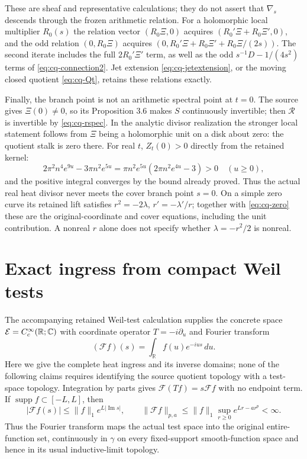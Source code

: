 These are sheaf and representative calculations; they do not assert
that $\nabla_s$ descends through the frozen arithmetic relation.
For a holomorphic local multiplier $R_0(s)$ the relation vector
$(R_0\Xi,0)$ acquires $(R_0'\Xi+R_0\Xi',0)$, and the odd
relation $(0,R_0\Xi)$ acquires
$(0,R_0'\Xi+R_0\Xi'+R_0\Xi/(2s))$.
The second iterate includes the full $2R_0'\Xi'$ term, as well as
the odd $s^{-1}D-1/(4s^2)$ terms of
\eqref{eq:cq-connection2}. Jet extension
\eqref{eq:cq-jetextension}, or the moving closed quotient
\eqref{eq:cq-Qt}, retains these relations exactly.

Finally, the branch point is not an arithmetic spectral point at
$t=0$. The source gives $\Xi(0)\ne0$, so its Proposition 3.6
makes $S$ continuously invertible; then $\mathcal R$ is invertible
by \eqref{eq:cq-rspec}. In the analytic divisor realization the
stronger local statement follows from $\Xi$ being a holomorphic
unit on a disk about zero: the quotient stalk is zero there.
For real $t$, $Z_t(0)>0$ directly from the retained kernel:
\[
 2\pi^2n^4e^{9u}-3\pi n^2e^{5u}
 =\pi n^2e^{5u}(2\pi n^2e^{4u}-3)>0\quad(u\geq0),
\]
and the positive integral converges by the bound already proved.
Thus the actual real heat divisor never meets the cover branch
point $s=0$. On a simple zero curve its retained lift satisfies
$r^2=-2\lambda$, $r'=-\lambda'/r$; together with
\eqref{eq:cq-zero} these are the original-coordinate and cover
equations, including the unit contribution. A nonreal $r$ alone
does not specify whether $\lambda=-r^2/2$ is nonreal.

\section{Exact ingress from compact Weil tests}
\label{sec:cq-tests}
The accompanying retained Weil-test calculation supplies the concrete
space $\mathcal E=C_c^\infty(\mathbb R;\mathbb C)$ with coordinate
operator $T=-i\partial_u$ and Fourier transform
\[
 (\mathscr Ff)(s)=\int_{\mathbb R}f(u)e^{-ius}\,du.
\]
Here we give the complete heat ingress and its inverse domains;
none of the following claims requires identifying the source
quotient topology with a test-space topology. Integration by parts
gives $\mathscr F(Tf)=s\mathscr Ff$ with no endpoint term.
If $\operatorname{supp}f\subset[-L,L]$, then
\[
 |\mathscr Ff(s)|\leq\|f\|_1e^{L|\operatorname{Im}s|},
 \qquad
 \|\mathscr Ff\|_{p,a}\leq
 \|f\|_1\sup_{r\geq0}e^{Lr-ar^p}<\infty.
\]
Thus the Fourier transform maps the actual test space into the
original entire-function set, continuously in $\gamma$ on every
fixed-support smooth-function space and hence in its usual
inductive-limit topology.

